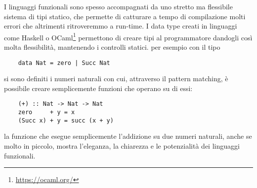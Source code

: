I linguaggi funzionali sono spesso accompagnati da uno stretto ma flessibile sistema di tipi statico, che permette di catturare a tempo di compilazione molti errori che altrimenti ritroveremmo a run-time. I data type creati in linguaggi come Haskell o OCaml\footnote{\url{https://ocaml.org/}}
permettono di creare tipi al programmatore dandogli così molta flessibilità, mantenendo i controlli statici. per esempio con il tipo 
\begin{verbatim}
	data Nat = zero | Succ Nat
\end{verbatim}
si sono definiti i numeri naturali con cui, attraverso il pattern matching, è possibile creare semplicemente funzioni che operano su di essi:
\begin{verbatim}
	(+) :: Nat -> Nat -> Nat
	zero     + y = x
	(Succ x) + y = succ (x + y) 
\end{verbatim}
la funzione \code{(+)} che esegue semplicemente l'addizione su due numeri naturali, anche se molto in piccolo, mostra l'eleganza, la chiarezza e le potenzialità dei linguaggi funzionali.

